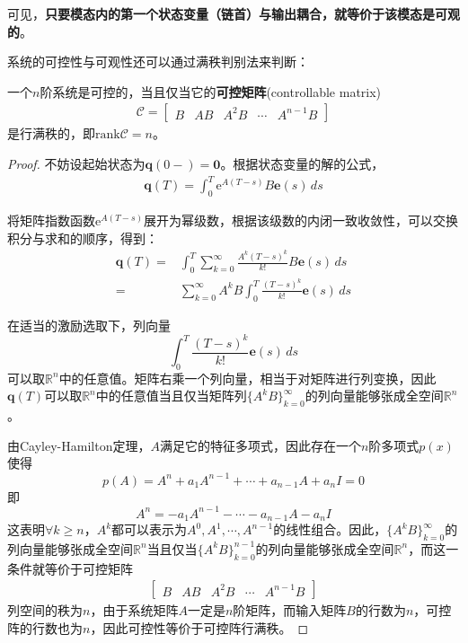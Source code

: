 可见，\textbf{只要模态内的第一个状态变量（链首）与输出耦合，就等价于该模态是可观的}。

系统的可控性与可观性还可以通过满秩判别法来判断：

\begin{theorem}[可控性的满秩判别法]
    一个$n$阶系统是可控的，当且仅当它的\textbf{可控矩阵}(controllable matrix)
    \begin{align*}
    \mathcal{C} =\begin{bmatrix}
    B & AB & A^2B & \cdots & A^{n-1}B
    \end{bmatrix}
    \end{align*}
    是行满秩的，即$\mathrm{rank}\mathcal{C}=n$。
\end{theorem}
\begin{proof}
    不妨设起始状态为$\mathbf{q}(0-)=\mathbf{0}$。根据状态变量的解的公式，\begin{align*}
    \mathbf{q}(T)=\int_0^T \mathrm{e}^{A(T-s)}B\mathbf{e}(s)\,ds
    \end{align*}

    将矩阵指数函数$\mathrm{e}^{A(T-s)}$展开为幂级数，根据该级数的内闭一致收敛性，可以交换积分与求和的顺序，得到：\begin{align*}
    \mathbf{q}(T)=&\int_0^T \sum_{k=0}^\infty \frac{A^k(T-s)^k}{k!}B\mathbf{e}(s)\,ds\\
    =&\sum_{k=0}^\infty A^k B\int_0^T \frac{(T-s)^k}{k!} \mathbf{e}(s)\,ds
    \end{align*}

    在适当的激励选取下，列向量
    $$\int_0^T \frac{(T-s)^k}{k!} \mathbf{e}(s)\,ds$$
    可以取$\mathbb{R}^n$中的任意值。矩阵右乘一个列向量，相当于对矩阵进行列变换，因此$\mathbf{q}(T)$可以取$\mathbb{R}^n$中的任意值当且仅当矩阵列$\{A^k B\}_{k=0}^\infty$的列向量能够张成全空间$\mathbb{R}^n$。

    由Cayley-Hamilton定理，$A$满足它的特征多项式，因此存在一个$n$阶多项式$p(x)$使得
    $$p(A)=A^n+a_1 A^{n-1}+\cdots+a_{n-1}A+a_n I=0$$
    即
    $$A^n=-a_1 A^{n-1}-\cdots-a_{n-1}A-a_n I$$
    这表明$\forall k\geq n$，$A^k$都可以表示为$A^0,A^1,\cdots,A^{n-1}$的线性组合。因此，$\{A^k B\}_{k=0}^\infty$的列向量能够张成全空间$\mathbb{R}^n$当且仅当$\{A^k B\}_{k=0}^{n-1}$的列向量能够张成全空间$\mathbb{R}^n$，而这一条件就等价于可控矩阵\begin{align*}
    \begin{bmatrix}
    B & AB & A^2B & \cdots & A^{n-1}B
    \end{bmatrix}
    \end{align*}
    列空间的秩为$n$，由于系统矩阵$A$一定是$n$阶矩阵，而输入矩阵$B$的行数为$n$，可控阵的行数也为$n$，因此可控性等价于可控阵行满秩。
\end{proof}

